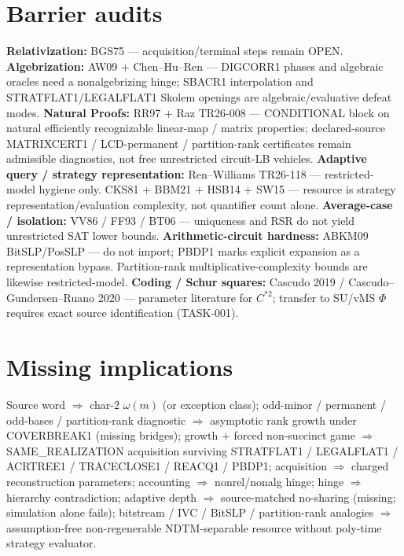\documentclass[11pt]{article}
\begin{document}
\section*{Barrier audits}
\textbf{Relativization:} BGS75 --- acquisition/terminal steps remain OPEN.
\textbf{Algebrization:} AW09 + Chen--Hu--Ren --- DIGCORR1 phases and algebraic oracles need a
nonalgebrizing hinge; SBACR1 interpolation and STRATFLAT1/LEGALFLAT1 Skolem openings are
algebraic/evaluative defeat modes.
\textbf{Natural Proofs:} RR97 + Raz TR26-008 --- CONDITIONAL block on natural efficiently
recognizable linear-map / matrix properties; declared-source MATRIXCERT1 / LCD-permanent /
partition-rank certificates remain admissible diagnostics, not free unrestricted circuit-LB
vehicles.
\textbf{Adaptive query / strategy representation:} Ren--Williams TR26-118 --- restricted-model
hygiene only. CKS81 + BBM21 + HSB14 + SW15 --- resource is strategy representation/evaluation
complexity, not quantifier count alone.
\textbf{Average-case / isolation:} VV86 / FF93 / BT06 --- uniqueness and RSR do not yield
unrestricted SAT lower bounds.
\textbf{Arithmetic-circuit hardness:} ABKM09 BitSLP/PosSLP --- do not import; PBDP1 marks
explicit expansion as a representation bypass. Partition-rank multiplicative-complexity bounds
are likewise restricted-model.
\textbf{Coding / Schur squares:} Cascudo 2019 / Cascudo--Gundersen--Ruano 2020 --- parameter
literature for $C^{*2}$; transfer to SU/vMS $\Phi$ requires exact source identification
(TASK-001).

\section*{Missing implications}
Source word $\Rightarrow$ char-$2$ $\omega(m)$ (or exception class);
odd-minor / permanent / odd-bases / partition-rank diagnostic $\Rightarrow$ asymptotic rank growth
under COVERBREAK1 (missing bridges);
growth + forced non-succinct game $\Rightarrow$ SAME\_REALIZATION acquisition surviving
STRATFLAT1 / LEGALFLAT1 / ACRTREE1 / TRACECLOSE1 / REACQ1 / PBDP1;
acquisition $\Rightarrow$ charged reconstruction parameters;
accounting $\Rightarrow$ nonrel/nonalg hinge;
hinge $\Rightarrow$ hierarchy contradiction;
adaptive depth $\Rightarrow$ source-matched no-sharing (missing; simulation alone fails);
bitstream / IVC / BitSLP / partition-rank analogies $\Rightarrow$ assumption-free non-regenerable
NDTM-separable resource without poly-time strategy evaluator.
\end{document}
